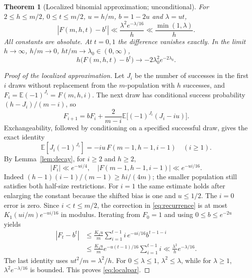 \documentclass[11pt]{article}
\newtheorem{theorem}{Theorem}[section]
\theoremstyle{remark}\newtheorem{remark}[theorem]{Remark}
\newcommand{\E}{\mathbb E}
\newcommand{\abs}[1]{\left|#1\right|}
\begin{document}
\begin{theorem}[Localized binomial approximation; unconditional]\label{thm:parity}
For $2\le h\le m/2$, $0\le t\le m/2$, $u=h/m$, $b=1-2u$ and $\lambda=ut$,
\begin{equation}\label{eq:localpar}
 \abs{F(m,h,t)-b^t}\ll \frac{\lambda^2 e^{-\lambda/16}}{h}
 \ll \frac{\min(1,\lambda)}{h}.
\end{equation}
All constants are absolute. At $t=0,1$ the difference vanishes exactly. In the limit $h\to\infty$, $h/m\to0$, $ht/m\to\lambda_0\in(0,\infty)$,
\begin{equation}\label{eq:sharp}
 h\bigl(F(m,h,t)-b^t\bigr)\longrightarrow -2\lambda_0^2e^{-2\lambda_0}.
\end{equation}
\end{theorem}
\begin{proof}[Proof of the localized approximation]
Let $J_i$ be the number of successes in the first $i$ draws without replacement from the $m$-population with $h$ successes, and $F_i=\E(-1)^{J_i}=F(m,h,i)$. The next draw has conditional success probability $(h-J_i)/(m-i)$, so
\begin{equation}\label{eq:recurrence}
 F_{i+1}=bF_i+\frac{2}{m-i}\E\bigl[(-1)^{J_i}(J_i-iu)\bigr].
\end{equation}
Exchangeability, followed by conditioning on a specified successful draw, gives the exact identity
\[
 \E[J_i(-1)^{J_i}]=-iu\,F(m-1,h-1,i-1)\quad(i\ge1).
\]
By Lemma~\ref{lem:decay}, for $i\ge2$ and $h\ge2$,
\[
 |F_i|\ll e^{-ui/4},\quad
 |F(m-1,h-1,i-1)|\ll e^{-ui/16}.
\]
Indeed $(h-1)(i-1)/(m-1)\ge hi/(4m)$; the smaller population still satisfies both half-size restrictions. For $i=1$ the same estimate holds after enlarging the constant because the shifted bias is one and $u\le1/2$. The $i=0$ error is zero. Since $i<t\le m/2$, the correction in \eqref{eq:recurrence} is at most $K_1 (ui/m)e^{-ui/16}$ in modulus. Iterating from $F_0=1$ and using $0\le b\le e^{-2u}$ yields
\begin{align*}
 |F_t-b^t|&\le \frac{K_1u}{m}\sum_{i=1}^{t-1}i\,e^{-ui/16}b^{t-1-i}\\
 &\le \frac{K_1u}{m}e^{-u(t-1)/16}\sum_{i=1}^{t-1}i
 \ll \frac{\lambda^2}{h}e^{-\lambda/16}.
\end{align*}
The last identity uses $ut^2/m=\lambda^2/h$. For $0\le\lambda\le1$, $\lambda^2\le\lambda$, while for $\lambda\ge1$, $\lambda^2e^{-\lambda/16}$ is bounded. This proves \eqref{eq:localpar}.
\end{proof}
\end{document}
